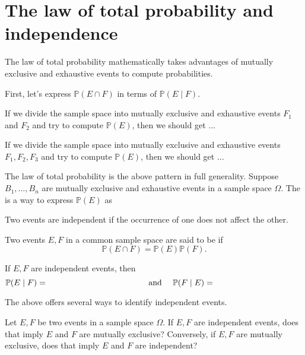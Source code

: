 \documentclass[../main.tex]{subfiles}
\begin{document}
 \section{The law of total probability and independence}

The law of total probability mathematically takes advantages of mutually exclusive and exhaustive events to compute probabilities.

First, let's express \(\mathbb{P}(E \cap F)\) in terms of \(\mathbb{P}(E \mid F)\).

If we divide the sample space into mutually exclusive and exhaustive events \(F_{1}\) and \(F_{2}\) and try to compute \(\mathbb{P}(E)\), then we should get ...


If we divide the sample space into mutually exclusive and exhaustive events \(F_{1}, F_{2}, F_{3}\) and try to compute \(\mathbb{P}(E)\), then we should get ...

\faStar{} The law of total probability is the above pattern in full generality. Suppose \(B_{1}, \ldots, B_{n}\) are mutually exclusive and exhaustive events in a sample space \(\Omega\). The  is a way to express \(\mathbb{P}(E)\) as 
\clearpage

Two events are independent if the occurrence of one does not affect the other.

\begin{definition}
  Two events \(E,F\) in a common sample space are said to be  if 
  \[
    \mathbb{P}(E \cap F) = \mathbb{P}(E) \mathbb{P}(F).
  \]
\end{definition}

\faStar{} If \(E,F\) are independent events, then
\begin{equation} \label{eq:probability-conditional-of-independent}
  \mathbb{P}(E \mid F) = \hspace{1.5in}
  \quad\text{ and }\quad
  \mathbb{P}(F \mid E) = \hspace{1.5in}
\end{equation}

The above offers several ways to identify independent events.

\begin{example} 
  Let \(E,F\) be two events in a sample space \(\Omega\). If \(E,F\) are independent events, does that imply \(E\) and \(F\) are mutually exclusive?  Conversely, if \(E,F\) are mutually exclusive, does that imply \(E\) and \(F\) are independent?

\end{example}
\end{document}
